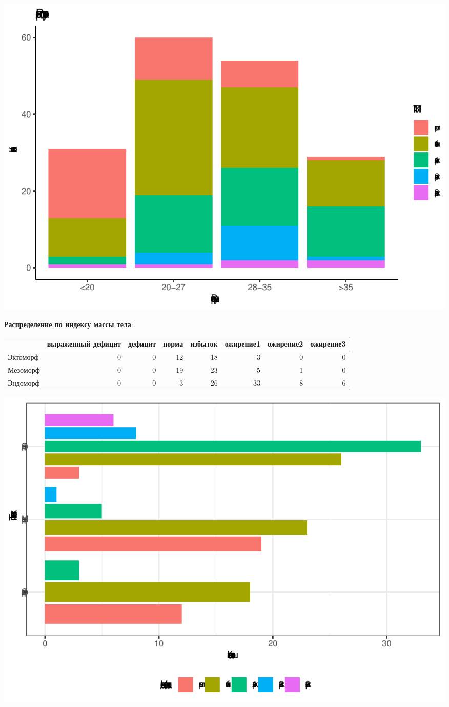 \documentclass[
]{article}
\begin{document}
\begin{center}\includegraphics[width=0.85\linewidth]{Regression-model-for-estimating-RM_files/figure-latex/unnamed-chunk-8-6} \end{center}

\textbf{Распределение по индексу массы тела}:

\begin{longtable}[]{@{}lrrrrrrr@{}}
\toprule
& выраженный дефицит & дефицит & норма & избыток & ожирение1 & ожирение2
& ожирение3\tabularnewline
\midrule
\endhead
Эктоморф & 0 & 0 & 12 & 18 & 3 & 0 & 0\tabularnewline
Мезоморф & 0 & 0 & 19 & 23 & 5 & 1 & 0\tabularnewline
Эндоморф & 0 & 0 & 3 & 26 & 33 & 8 & 6\tabularnewline
\bottomrule
\end{longtable}

\begin{center}\includegraphics[width=0.9\linewidth]{Regression-model-for-estimating-RM_files/figure-latex/unnamed-chunk-9-1} \end{center}
\end{document}
